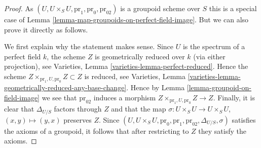 \documentclass{stacks-project}
\theoremstyle{plain}
\theoremstyle{definition}
\theoremstyle{remark}
\numberwithin{equation}{subsection}
\begin{document}
\begin{proof}
As $(U, U \times_S U, \text{pr}_1, \text{pr}_0, \text{pr}_{02})$
is a groupoid scheme over $S$ this is a special case of
Lemma \ref{lemma-map-groupoids-on-perfect-field-image}.
But we can also prove it directly as follows.

\medskip\noindent
We first explain why the statement makes sense. Since $U$ is the spectrum
of a perfect field $k$, the scheme $Z$ is geometrically reduced
over $k$ (via either projection), see
Varieties, Lemma \ref{varieties-lemma-perfect-reduced}.
Hence the scheme $Z \times_{\text{pr}_1, U, \text{pr}_0} Z \subset Z$
is reduced, see
Varieties, Lemma \ref{varieties-lemma-geometrically-reduced-any-base-change}.
Hence by
Lemma \ref{lemma-groupoid-on-field-image}
we see that $\text{pr}_{02}$ induces a morphism
$Z \times_{\text{pr}_1, U, \text{pr}_0} Z \to Z$.
Finally, it is clear that $\Delta_{U/S}$ factors through $Z$
and that the map
$\sigma : U \times_S U \to U \times_S U$, $(x, y) \mapsto (y, x)$
preserves $Z$. Since
$(U, U \times_S U, \text{pr}_0, \text{pr}_1, \text{pr}_{02},
\Delta_{U/S}, \sigma)$
satisfies the axioms of a groupoid, it follows that after restricting
to $Z$ they satisfy the axioms.
\end{proof}
\end{document}

